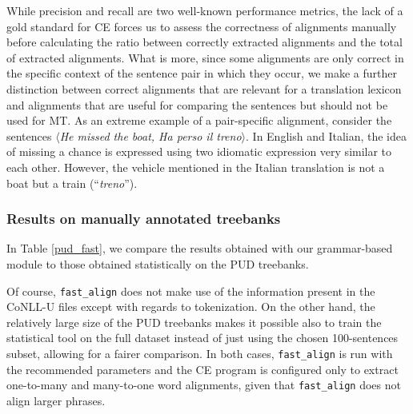 \documentclass[11pt]{article}
\begin{document}
While precision and recall are two well-known performance metrics, the lack of a gold standard for CE forces us to assess the correctness of alignments manually before calculating the ratio between correctly extracted alignments and the total of extracted alignments.
What is more, since some alignments are only correct in the specific context of the sentence pair in which they occur, we make a further distinction between correct alignments that are relevant for a translation lexicon and alignments that are useful for comparing the sentences but should not be used for MT. 
As an extreme example of a pair-specific alignment, consider the sentences $\langle$\textit{He missed the boat, Ha perso il treno}$\rangle$. 
In English and Italian, the idea of missing a chance is expressed using two idiomatic expression very similar to each other. 
However, the vehicle mentioned in the Italian translation is not a boat but a train (``\textit{treno}'').

\subsubsection{Results on manually annotated treebanks} 
In Table \ref{pud_fast}, we compare the results obtained with our grammar-based module to those obtained statistically on the PUD treebanks. 

Of course, \texttt{fast\_align} does not make use of the information present in the CoNLL-U files except with regards to tokenization. 
On the other hand, the relatively large size of the PUD treebanks makes it possible also to train the statistical tool on the full dataset instead of just using the chosen 100-sentences subset, allowing for a fairer comparison. 
In both cases, \texttt{fast\_align} is run with the recommended parameters and the CE program is configured only to extract one-to-many and many-to-one word alignments, given that \texttt{fast\_align} does not align larger phrases.
\end{document}
